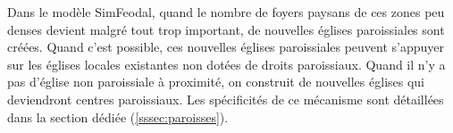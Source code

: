 \begin{itemize}
	\begin{tcolorbox}[breakable,left=0pt,right=0pt,top=0pt,bottom=0pt,
		colback=gray!15,colframe=gray!15,width=\dimexpr0.94\textwidth\relax, 
		enlarge left by=0mm, boxsep=5pt,arc=0pt,outer arc=0pt]
	Dans le modèle SimFeodal, quand le nombre de foyers paysans de ces zones peu denses devient malgré tout trop important, de nouvelles églises paroissiales sont créées.
	Quand c'est possible, ces nouvelles églises paroissiales peuvent s'appuyer sur les églises locales existantes non dotées de droits paroissiaux.
	Quand il n'y a pas d'église non paroissiale à proximité, on construit de nouvelles églises qui deviendront centres paroissiaux.
	Les spécificités de ce mécanisme sont détaillées dans la section dédiée (\cref{sssec:paroisses}).
\end{tcolorbox}
\end{itemize}



%

